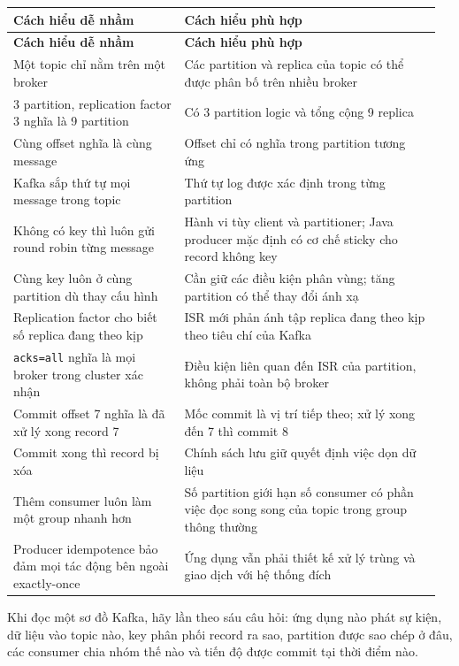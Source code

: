 \begingroup\small
\renewcommand{\arraystretch}{1.23}
\begin{longtable}{@{}p{0.38\linewidth}p{0.58\linewidth}@{}}
\toprule
\rowcolor{rowLavender}
\textbf{Cách hiểu dễ nhầm} & \textbf{Cách hiểu phù hợp} \\
\midrule
\endfirsthead
\toprule
\rowcolor{rowLavender}
\textbf{Cách hiểu dễ nhầm} & \textbf{Cách hiểu phù hợp} \\
\midrule
\endhead
\bottomrule
\endfoot
Một topic chỉ nằm trên một broker & Các partition và replica của topic có thể được phân bố trên nhiều broker \\
3 partition, replication factor 3 nghĩa là 9 partition & Có 3 partition logic và tổng cộng 9 replica \\
Cùng offset nghĩa là cùng message & Offset chỉ có nghĩa trong partition tương ứng \\
Kafka sắp thứ tự mọi message trong topic & Thứ tự log được xác định trong từng partition \\
Không có key thì luôn gửi round robin từng message & Hành vi tùy client và partitioner; Java producer mặc định có cơ chế sticky cho record không key \\
Cùng key luôn ở cùng partition dù thay cấu hình & Cần giữ các điều kiện phân vùng; tăng partition có thể thay đổi ánh xạ \\
Replication factor cho biết số replica đang theo kịp & ISR mới phản ánh tập replica đang theo kịp theo tiêu chí của Kafka \\
\texttt{acks=\allowbreak{}all} nghĩa là mọi broker trong cluster xác nhận & Điều kiện liên quan đến ISR của partition, không phải toàn bộ broker \\
Commit offset 7 nghĩa là đã xử lý xong record 7 & Mốc commit là vị trí tiếp theo; xử lý xong đến 7 thì commit 8 \\
Commit xong thì record bị xóa & Chính sách lưu giữ quyết định việc dọn dữ liệu \\
Thêm consumer luôn làm một group nhanh hơn & Số partition giới hạn số consumer có phần việc đọc song song của topic trong group thông thường \\
Producer idempotence bảo đảm mọi tác động bên ngoài exactly-once & Ứng dụng vẫn phải thiết kế xử lý trùng và giao dịch với hệ thống đích \\
\end{longtable}
\endgroup

Khi đọc một sơ đồ Kafka, hãy lần theo sáu câu hỏi: ứng dụng nào phát sự kiện, dữ liệu vào topic nào, key phân phối record ra sao, partition được sao chép ở đâu, các consumer chia nhóm thế nào và tiến độ được commit tại thời điểm nào.



